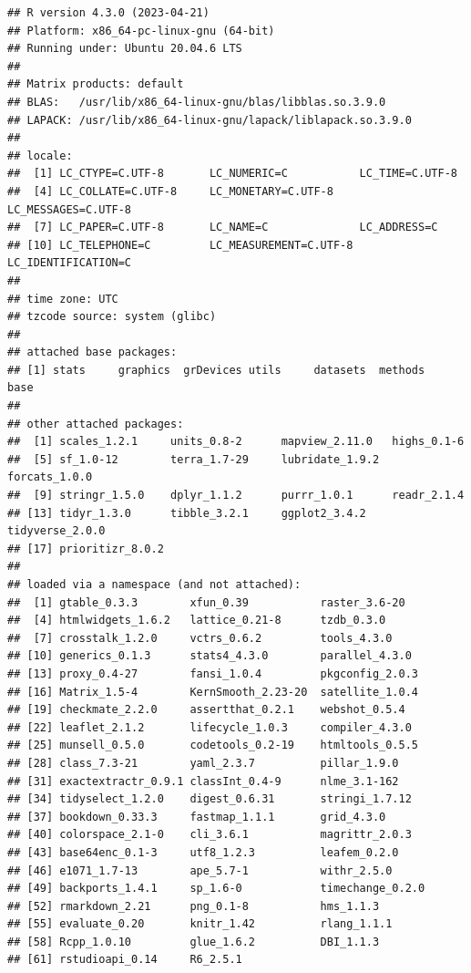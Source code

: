\documentclass[
  12pt,
]{book}
\begin{document}
\begin{verbatim}
## R version 4.3.0 (2023-04-21)
## Platform: x86_64-pc-linux-gnu (64-bit)
## Running under: Ubuntu 20.04.6 LTS
## 
## Matrix products: default
## BLAS:   /usr/lib/x86_64-linux-gnu/blas/libblas.so.3.9.0 
## LAPACK: /usr/lib/x86_64-linux-gnu/lapack/liblapack.so.3.9.0
## 
## locale:
##  [1] LC_CTYPE=C.UTF-8       LC_NUMERIC=C           LC_TIME=C.UTF-8       
##  [4] LC_COLLATE=C.UTF-8     LC_MONETARY=C.UTF-8    LC_MESSAGES=C.UTF-8   
##  [7] LC_PAPER=C.UTF-8       LC_NAME=C              LC_ADDRESS=C          
## [10] LC_TELEPHONE=C         LC_MEASUREMENT=C.UTF-8 LC_IDENTIFICATION=C   
## 
## time zone: UTC
## tzcode source: system (glibc)
## 
## attached base packages:
## [1] stats     graphics  grDevices utils     datasets  methods   base     
## 
## other attached packages:
##  [1] scales_1.2.1     units_0.8-2      mapview_2.11.0   highs_0.1-6     
##  [5] sf_1.0-12        terra_1.7-29     lubridate_1.9.2  forcats_1.0.0   
##  [9] stringr_1.5.0    dplyr_1.1.2      purrr_1.0.1      readr_2.1.4     
## [13] tidyr_1.3.0      tibble_3.2.1     ggplot2_3.4.2    tidyverse_2.0.0 
## [17] prioritizr_8.0.2
## 
## loaded via a namespace (and not attached):
##  [1] gtable_0.3.3        xfun_0.39           raster_3.6-20      
##  [4] htmlwidgets_1.6.2   lattice_0.21-8      tzdb_0.3.0         
##  [7] crosstalk_1.2.0     vctrs_0.6.2         tools_4.3.0        
## [10] generics_0.1.3      stats4_4.3.0        parallel_4.3.0     
## [13] proxy_0.4-27        fansi_1.0.4         pkgconfig_2.0.3    
## [16] Matrix_1.5-4        KernSmooth_2.23-20  satellite_1.0.4    
## [19] checkmate_2.2.0     assertthat_0.2.1    webshot_0.5.4      
## [22] leaflet_2.1.2       lifecycle_1.0.3     compiler_4.3.0     
## [25] munsell_0.5.0       codetools_0.2-19    htmltools_0.5.5    
## [28] class_7.3-21        yaml_2.3.7          pillar_1.9.0       
## [31] exactextractr_0.9.1 classInt_0.4-9      nlme_3.1-162       
## [34] tidyselect_1.2.0    digest_0.6.31       stringi_1.7.12     
## [37] bookdown_0.33.3     fastmap_1.1.1       grid_4.3.0         
## [40] colorspace_2.1-0    cli_3.6.1           magrittr_2.0.3     
## [43] base64enc_0.1-3     utf8_1.2.3          leafem_0.2.0       
## [46] e1071_1.7-13        ape_5.7-1           withr_2.5.0        
## [49] backports_1.4.1     sp_1.6-0            timechange_0.2.0   
## [52] rmarkdown_2.21      png_0.1-8           hms_1.1.3          
## [55] evaluate_0.20       knitr_1.42          rlang_1.1.1        
## [58] Rcpp_1.0.10         glue_1.6.2          DBI_1.1.3          
## [61] rstudioapi_0.14     R6_2.5.1
\end{verbatim}

  
\end{document}
